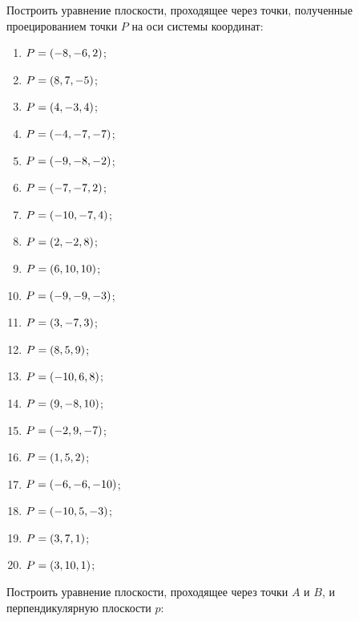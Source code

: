 	\vspace{15pt}
	Построить уравнение плоскости, проходящее через точки, полученные проецированием точки $P$ на оси системы координат:

	\begin{multicols}{2}
		\begin{enumerate}
			\setcounter{enumi}{\value{tasks}}

				\item \( P = \left( -8, -6, 2 \right) \);
				\item \( P = \left( 8, 7, -5 \right) \);
				\item \( P = \left( 4, -3, 4 \right) \);
				\item \( P = \left( -4, -7, -7 \right) \);
				\item \( P = \left( -9, -8, -2 \right) \);
				\item \( P = \left( -7, -7, 2 \right) \);
				\item \( P = \left( -10, -7, 4 \right) \);
				\item \( P = \left( 2, -2, 8 \right) \);
				\item \( P = \left( 6, 10, 10 \right) \);
				\item \( P = \left( -9, -9, -3 \right) \);
				\item \( P = \left( 3, -7, 3 \right) \);
				\item \( P = \left( 8, 5, 9 \right) \);
				\item \( P = \left( -10, 6, 8 \right) \);
				\item \( P = \left( 9, -8, 10 \right) \);
				\item \( P = \left( -2, 9, -7 \right) \);
				\item \( P = \left( 1, 5, 2 \right) \);
				\item \( P = \left( -6, -6, -10 \right) \);
				\item \( P = \left( -10, 5, -3 \right) \);
				\item \( P = \left( 3, 7, 1 \right) \);
				\item \( P = \left( 3, 10, 1 \right) \);

			\setcounter{tasks}{\value{enumi}}
		\end{enumerate}
	\end{multicols}

	\pagebreak
	Построить уравнение плоскости, проходящее через точки $A$ и $B$, и перпендикулярную плоскости $p$:

